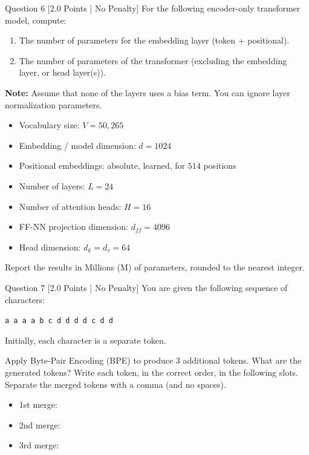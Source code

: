 \documentclass[11pt,a4paper]{article}
\begin{document}
\begin{questionbox}{Question 6 \hfill [2.0 Points | No Penalty]}
For the following encoder-only transformer model, compute:
\begin{enumerate}
    \item The number of parameters for the embedding layer (token + positional).
    \item The number of parameters of the transformer (excluding the embedding layer, or head layer(s)).
\end{enumerate}
\textbf{Note:} Assume that none of the layers uses a bias term. You can ignore layer normalization parameters.
\begin{itemize}
    \item Vocabulary size: $V = 50,265$
    \item Embedding / model dimension: $d = 1024$
    \item Positional embeddings: absolute, learned, for $514$ positions
    \item Number of layers: $L = 24$
    \item Number of attention heads: $H = 16$
    \item FF-NN projection dimension: $d_{ff} = 4096$
    \item Head dimension: $d_k = d_v = 64$
\end{itemize}
Report the results in Millions (M) of parameters, rounded to the nearest integer.
\end{questionbox}

\begin{questionbox}{Question 7 \hfill [2.0 Points | No Penalty]}
You are given the following sequence of characters:
\begin{center}
\texttt{a a a a b c d d d d c d d}
\end{center}
Initially, each character is a separate token.

Apply Byte-Pair Encoding (BPE) to produce 3 additional tokens. What are the generated tokens?
Write each token, in the correct order, in the following slots. Separate the merged tokens with a comma (and no spaces).
\begin{itemize}
    \item 1st merge: \underline{\hspace{4cm}}
    \item 2nd merge: \underline{\hspace{4cm}}
    \item 3rd merge: \underline{\hspace{4cm}}
\end{itemize}
\end{questionbox}
\end{document}
